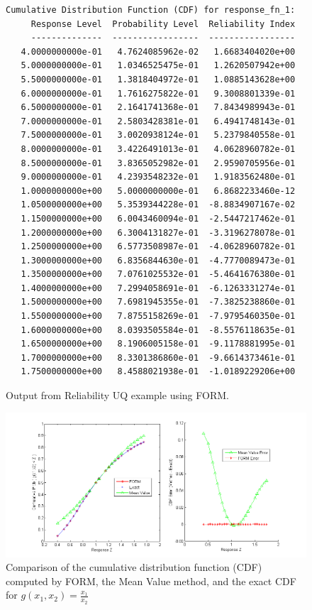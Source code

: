 \begin{figure}[htbp!]
\centering
\begin{bigbox}
\begin{small}
\begin{verbatim}
Cumulative Distribution Function (CDF) for response_fn_1:
     Response Level  Probability Level  Reliability Index
     --------------  -----------------  -----------------
   4.0000000000e-01   4.7624085962e-02   1.6683404020e+00
   5.0000000000e-01   1.0346525475e-01   1.2620507942e+00
   5.5000000000e-01   1.3818404972e-01   1.0885143628e+00
   6.0000000000e-01   1.7616275822e-01   9.3008801339e-01
   6.5000000000e-01   2.1641741368e-01   7.8434989943e-01
   7.0000000000e-01   2.5803428381e-01   6.4941748143e-01
   7.5000000000e-01   3.0020938124e-01   5.2379840558e-01
   8.0000000000e-01   3.4226491013e-01   4.0628960782e-01
   8.5000000000e-01   3.8365052982e-01   2.9590705956e-01
   9.0000000000e-01   4.2393548232e-01   1.9183562480e-01
   1.0000000000e+00   5.0000000000e-01   6.8682233460e-12
   1.0500000000e+00   5.3539344228e-01  -8.8834907167e-02
   1.1500000000e+00   6.0043460094e-01  -2.5447217462e-01
   1.2000000000e+00   6.3004131827e-01  -3.3196278078e-01
   1.2500000000e+00   6.5773508987e-01  -4.0628960782e-01
   1.3000000000e+00   6.8356844630e-01  -4.7770089473e-01
   1.3500000000e+00   7.0761025532e-01  -5.4641676380e-01
   1.4000000000e+00   7.2994058691e-01  -6.1263331274e-01
   1.5000000000e+00   7.6981945355e-01  -7.3825238860e-01
   1.5500000000e+00   7.8755158269e-01  -7.9795460350e-01
   1.6000000000e+00   8.0393505584e-01  -8.5576118635e-01
   1.6500000000e+00   8.1906005158e-01  -9.1178881995e-01
   1.7000000000e+00   8.3301386860e-01  -9.6614373461e-01
   1.7500000000e+00   8.4588021938e-01  -1.0189229206e+00
\end{verbatim}
\end{small}
\end{bigbox}
\caption{Output from Reliability UQ example using FORM.}
\label{uq:rel_output_form}
\end{figure}

\begin{figure}[htbp!]
  \centering
  \includegraphics[scale=0.5]{images/cdf_form}
\caption{Comparison of the cumulative distribution function (CDF) computed by
FORM, the Mean Value method, and the exact CDF for $g(x_1,x_2)=\frac{x_1}{x_2}$}
\label{uq:rel_form_compare}
\end{figure}


